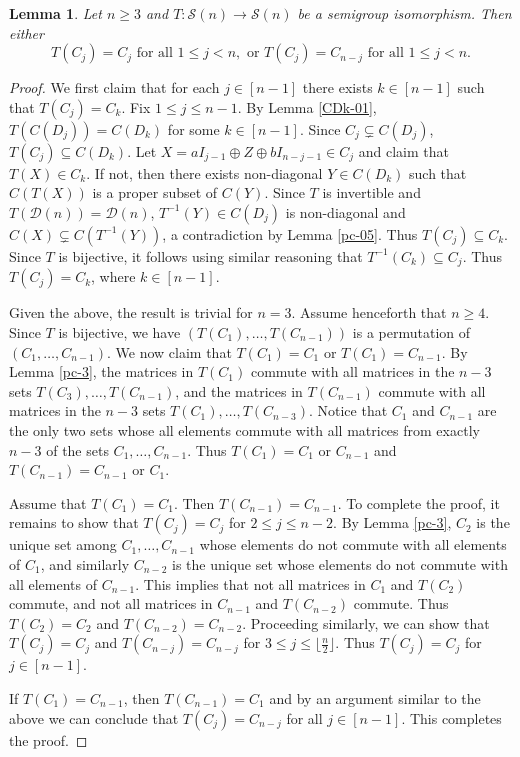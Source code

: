 \documentclass[11pt,reqno]{amsart}
\theoremstyle{plain}
\newtheorem{lemma}[theorem]{Lemma}
\theoremstyle{definition}
\numberwithin{equation}{section}
\def\cS{\mathcal S}
\def\cD{\mathcal D}
\begin{document}
\begin{lemma} \label{pc-4}
	Let $n \ge 3$ and  $T:\cS(n)\to \cS(n)$ be a semigroup isomorphism.  Then either
	\[ T(C_j) = C_j \text{ for all } 1 \le j < n, \text{ or } T(C_j) =  C_{n-j} \text{ for all }1 \le j < n.\]
\end{lemma}
\begin{proof}
 We first claim that for each $j\in[n-1]$ there exists $k\in[n-1]$ such that $T(C_j) = C_k$.  Fix $1\leq j\leq n-1$. By Lemma \ref{CDk-01}, $T(C(D_j))=C(D_k)$ for some $k\in[n-1]$. Since $C_j \subsetneq C(D_j)$, $T(C_j)\subseteq C(D_k)$.  Let $X = aI_{j-1} \oplus Z \oplus bI_{n-j-1}\in C_j$ and claim that $T(X)\in C_k$. If not, then there exists non-diagonal $Y\in C(D_k)$ such that $C(T(X))$ is a proper subset of $C(Y)$. Since $T$ is invertible and $T(\cD(n))=\cD(n)$, $T^{-1}(Y)\in C(D_j)$ is non-diagonal and $C(X)\subsetneq C(T^{-1}(Y))$, a contradiction by Lemma \ref{pc-05}. Thus $T(C_j)\subseteq C_k$. Since $T$ is bijective, it follows using similar reasoning that $T^{-1}(C_k)\subseteq C_j$. Thus  $T(C_j)= C_k$, where $ k\in[n-1]$.	
	
	
Given the above, the result is trivial for $n=3$. Assume henceforth that $n\geq4$. Since $T$ is bijective, we have $(T(C_1), \dots, T(C_{n-1}))$
is a permutation of $(C_1, \dots, C_{n-1})$. We now claim that $T(C_1)=C_1$ or $T(C_1)=C_{n-1}$. By Lemma \ref{pc-3}, the matrices in $T(C_1)$ commute with all matrices in the $n-3$ sets $T(C_3), \dots, T(C_{n-1})$, and the matrices in $T(C_{n-1})$ commute with all matrices in the $n-3$ sets $T(C_1), \dots, T(C_{n-3})$. Notice that $C_1$ and $C_{n-1}$ are the only two sets whose all elements commute with all matrices from exactly $n-3$ of the sets  $C_1, \dots, C_{n-1}$. Thus $T(C_1)=C_1$ or $C_{n-1}$ and $T(C_{n-1})= C_{n-1}$ or $C_1$.

Assume that $T(C_1)=C_1$. Then $T(C_{n-1})= C_{n-1}$. To complete the proof, it remains to show that $T(C_j)=C_j$ for $2\leq j\leq n-2$. By Lemma \ref{pc-3}, $C_2$ is the unique set among $C_1, \dots, C_{n-1}$ whose elements do not commute with all elements of $C_1$, and similarly $C_{n-2}$ is the unique set whose elements do not commute with all elements of $C_{n-1}$. This implies that not all matrices in  $C_1$ and $T(C_2)$ commute, and not all matrices in  $C_{n-1}$ and $T(C_{n-2})$ commute. Thus $T(C_2)=C_2$ and $T(C_{n-2})=C_{n-2}$. Proceeding similarly, we can show that  $T(C_j)=C_j$ and $T(C_{n-j})= C_{n-j}$ for $3\leq j \leq \lfloor \frac{n}{2}\rfloor$. Thus $T(C_j)=C_j$ for $j \in[n-1]$.

If  $T(C_1)=C_{n-1}$, then  $T(C_{n-1})= C_{1}$ and by an argument  similar to the above we can conclude that $T(C_j)=C_{n-j}$ for all $j\in[n-1]$. This completes the proof.
\end{proof}
\end{document}
